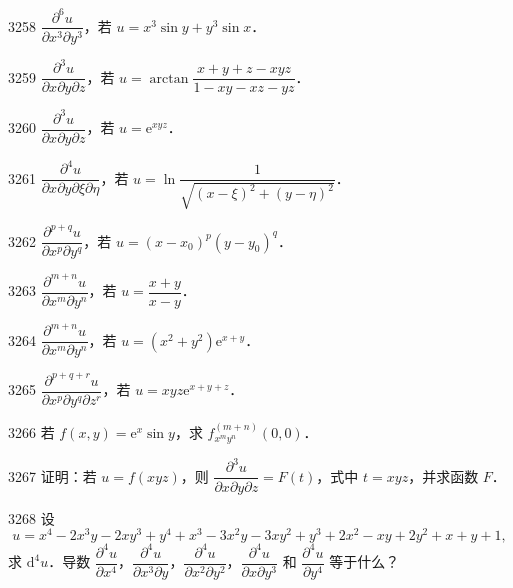 \begin{prob}[S]{3258}
$\dfrac{\partial^6 u}{\partial x^3 \partial y^3}$，若 $u = x^3 \sin y + y^3 \sin x$．
\end{prob}

\begin{prob}[M]{3259}
$\dfrac{\partial^3 u}{\partial x\partial y\partial z}$，若 $u = \arctan\dfrac{x+y+z-xyz}{1-xy-xz-yz}$．
\end{prob}

\begin{prob}[S]{3260}
$\dfrac{\partial^3 u}{\partial x\partial y\partial z}$，若 $u = \mathrm{e}^{xyz}$．
\end{prob}

\begin{prob}[M]{3261}
$\dfrac{\partial^4 u}{\partial x\partial y\partial\xi\partial\eta}$，若 $u = \ln\dfrac{1}{\sqrt{(x-\xi)^2 + (y-\eta)^2}}$．
\end{prob}

\begin{prob}[S]{3262}
$\dfrac{\partial^{p+q} u}{\partial x^p \partial y^q}$，若 $u = (x-x_0)^p (y-y_0)^q$．
\end{prob}

\begin{prob}[S]{3263}
$\dfrac{\partial^{m+n} u}{\partial x^m \partial y^n}$，若 $u = \dfrac{x+y}{x-y}$．
\end{prob}

\begin{prob}[S]{3264}
$\dfrac{\partial^{m+n} u}{\partial x^m \partial y^n}$，若 $u = (x^2+y^2)\mathrm{e}^{x+y}$．
\end{prob}

\begin{prob}[S]{3265}
$\dfrac{\partial^{p+q+r} u}{\partial x^p \partial y^q \partial z^r}$，若 $u = xyz\mathrm{e}^{x+y+z}$．
\end{prob}

\begin{prob}[S]{3266}
若 $f(x,y) = \mathrm{e}^x \sin y$，求 $f^{(m+n)}_{x^m y^n}(0,0)$．
\end{prob}

\begin{prob}[M]{3267}
证明：若 $u = f(xyz)$，则 $\dfrac{\partial^3 u}{\partial x\partial y\partial z} = F(t)$，式中 $t = xyz$，并求函数 $F$．
\end{prob}

\begin{prob}[M]{3268}
设
\[
u = x^4 - 2x^3 y - 2xy^3 + y^4 + x^3 - 3x^2 y - 3xy^2 + y^3 + 2x^2 - xy + 2y^2 + x + y + 1,
\]
求 $\mathrm{d}^4 u$．导数 $\dfrac{\partial^4 u}{\partial x^4}$，$\dfrac{\partial^4 u}{\partial x^3 \partial y}$，$\dfrac{\partial^4 u}{\partial x^2 \partial y^2}$，$\dfrac{\partial^4 u}{\partial x\partial y^3}$ 和 $\dfrac{\partial^4 u}{\partial y^4}$ 等于什么？
\end{prob}

